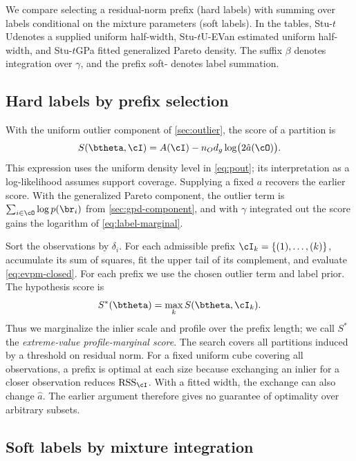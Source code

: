 \documentclass[10pt,twocolumn,letterpaper]{article}
\DeclareMathOperator{\RSS}{RSS}
\newcommand{\mname}[1]{\texorpdfstring{#1\xspace}{#1}}
\newif\ifsubscriptnames
\newcommand{\evname}{\ifsubscriptnames$_{\mathrm{EV}}$\else-EV\fi}
\newcommand{\stuU}{\mname{Stu-$t$U}}
\newcommand{\stuUev}{\mname{Stu-$t$U\evname}}
\newcommand{\stuGP}{\mname{Stu-$t$GP}}
\newcommand{\ahat}{\hat a}
\begin{document}
We compare selecting a residual-norm prefix (hard labels) with
summing over labels conditional on the mixture parameters (soft labels).
In the tables, \stuU denotes a supplied uniform half-width, \stuUev an
estimated uniform half-width, and \stuGP a fitted generalized Pareto
density. The suffix $\beta$ denotes integration over $\gamma$, and the
prefix soft- denotes label summation.

\subsection{Hard labels by prefix selection}
\label{sec:computation}

With the uniform outlier component of \cref{sec:outlier}, the score of
a partition is
\begin{equation}
 S(\btheta,\cI)=A(\cI)-n_O d_g\log\bigl(2\ahat(\cO)\bigr).
 \label{eq:evpm-closed}
\end{equation}
This expression uses the uniform density level in \cref{eq:pout};
its interpretation as a log-likelihood assumes support coverage.
Supplying a fixed $a$ recovers the earlier score. With the
generalized Pareto component, the outlier term is
$\sum_{i\in\cO}\log p(\br_i)$ from \cref{sec:gpd-component}, and with
$\gamma$ integrated out the score gains the logarithm of
\cref{eq:label-marginal}.

Sort the observations by $\delta_i$. For each admissible prefix
$\cI_k=\{(1),\ldots,(k)\}$, accumulate its sum of squares, fit the
upper tail of its complement, and evaluate \cref{eq:evpm-closed}.
For each prefix we use the chosen outlier term and label prior. The hypothesis score is
\begin{equation}
 S^*(\btheta)=\max_{k}S(\btheta,\cI_k).
 \label{eq:evpm-profile}
\end{equation}
Thus we marginalize the inlier scale and profile over the prefix length;
we call $S^*$ the \emph{extreme-value profile-marginal score}. The
search covers all partitions induced by a threshold on residual norm.
For a fixed uniform cube covering all observations, a prefix is optimal at each size because
exchanging an inlier for a closer observation reduces $\RSS_\cI$.
With a fitted width, the exchange can also change $\ahat$. The earlier
argument therefore gives no guarantee of optimality over arbitrary
subsets.

\subsection{Soft labels by mixture integration}
\label{sec:soft}
\end{document}
